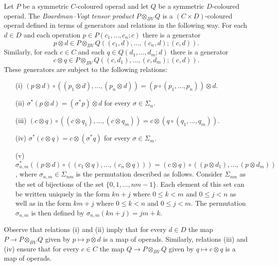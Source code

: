 \begin{defn}
Let $P$ be a symmetric $C$-coloured operad and let $Q$ be a symmetric $D$-coloured operad. The \emph{Boardman--Vogt tensor product} $P\otimes_{BV}Q$ is a $(C\times D)$-coloured operad defined in terms of generators and relations in the following way. For each $d\in D$ and each operation $p\in P(c_1,\ldots, c_n;c)$ there is a generator
$$
p\otimes d\in P\otimes_{BV}Q ((c_1, d),\ldots, (c_n,d); (c,d)).
$$
Similarly, for each $c\in C$ and each $q\in Q(d_1,\ldots, d_m;d)$ there is a generator
$$
c\otimes q\in P\otimes_{BV}Q ((c,d_1), \ldots, (c, d_m); (c,d)).
$$
These generators are subject to the following relations:
\begin{itemize}
\item[(i)] $(p\otimes d)\circ ((p_1\otimes d),\ldots, (p_n\otimes d))=(p\circ (p_1,\ldots, p_n))\otimes d$.
\item[(ii)] $\sigma^*(p\otimes d)=(\sigma^*p)\otimes d$ for every $\sigma\in \Sigma_n$.
\item[(iii)] $(c\otimes q)\circ ((c\otimes q_1),\ldots, (c\otimes q_m))=c\otimes (q\circ (q_1,\ldots, q_m))$.
\item[(iv)] $\sigma^*(c\otimes q)=c\otimes (\sigma^*q)$ for every $\sigma\in \Sigma_m$.
\item[(v)] $\sigma_{n,m}^*((p\otimes d)\circ((c_1\otimes q),\ldots, (c_n\otimes q)))=
(c\otimes q)\circ ((p\otimes d_1),\ldots, (p\otimes d_m))$, where
$\sigma_{n,m}\in \Sigma_{nm}$ is the permutation described as
follows. Consider $\Sigma_{nm}$ as the set of bijections of
the set $\{0,1,\ldots, nm-1\}$. Each element of this set can
be written uniquely in the form $kn+j$ where $0\le k<m$ and $0\le
j<n$ as well as in the form $km+j$ where $0\le k<n$ and $0\le j<m$.
The permutation $\sigma_{n,m}$ is then defined by
$\sigma_{n,m}(kn+j)=jm+k$.
\end{itemize}
\end{defn}

Observe that relations (i) and (ii) imply that for every $d\in D$ the map $P\longrightarrow P\otimes_{BV}Q$ given by $p\longmapsto p\otimes d$ is a map of operads. Similarly, relations (iii) and (iv) ensure that for every $c\in C$ the map $Q\longrightarrow P\otimes_{BV}Q$ given by $q\longmapsto c\otimes q$ is a map of operads.

